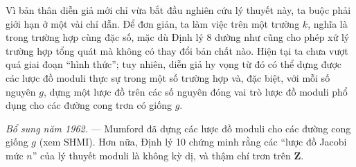 
Vì bản thân diễn giả mới chỉ vừa bắt đầu nghiên cứu lý thuyết này, ta buộc
phải giới hạn ở một vài chỉ dẫn. Để đơn giản, ta làm việc trên một trường $k$,
nghĩa là trong trường hợp cùng đặc số, mặc dù Định lý 8 dường như cũng cho phép
xử lý trường hợp tổng quát mà không có thay đổi bản chất nào. Hiện tại ta chưa
vượt quá giai đoạn “hình thức”; tuy nhiên, diễn giả hy vọng từ đó có thể dựng
được các lược đồ moduli thực sự trong một số trường hợp và, đặc biệt, với mỗi
số nguyên $g$, dựng một lược đồ trên các số nguyên đóng vai trò lược đồ moduli
phổ dụng cho các đường cong trơn có giống $g$.

\emph{Bổ sung năm 1962.} --- Mumford đã dựng các lược đồ moduli cho các đường
cong giống $g$ (xem SHMI). Hơn nữa, Định lý 10 chứng minh rằng các “lược đồ
Jacobi mức $n$” của lý thuyết moduli là không kỳ dị, và thậm chí trơn trên
$\mathbf Z$.

